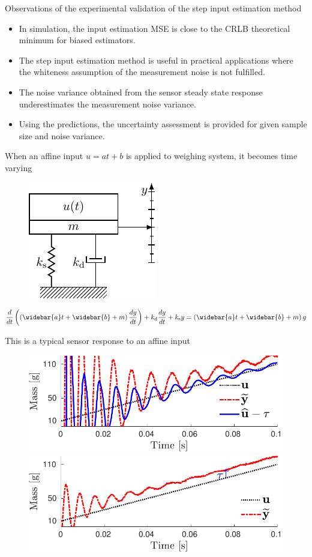 \documentclass[presentation]{beamer}
\begin{document}
\begin{frame}[label={slide:experimental-validation8}]{Observations of the experimental validation of the step input estimation method}
\begin{itemize}
\item In simulation, the input estimation MSE is close to the CRLB theoretical minimum for biased estimators.
\item The step input estimation method is useful in practical applications where the whiteness assumption of the measurement noise is not fulfilled. 
\item The noise variance obtained from the sensor steady state response underestimates the measurement noise variance.
\item Using the predictions, the uncertainty assessment is provided for given sample size and noise variance.
\end{itemize}

\end{frame}


\begin{frame}[label={slide:affine-input-estimation1}]{When an affine input $u=at+b$ is applied to weighing system, it becomes time varying}
\begin{figure}[htb!]
\centering
\includegraphics[width=0.3\columnwidth]{./fig/Aff_Fig_1.pdf} 
\end{figure}
\begin{equation*} \dfrac{d}{dt} \left( \left( \widebar{a} t + \widebar{b} + m \right) \dfrac{dy}{dt} \right) + k_{\mathrm{d}} \dfrac{dy}{dt} + k_{\mathrm{s}} y = \left( \widebar{a} t + \widebar{b} + m \right) g \end{equation*}
\end{frame}

\begin{frame}[label={slide:affine-input-estimation2}]{This is a typical sensor response to an affine input}
\begin{figure}[htb!]
\centering
\includegraphics[width=0.55\columnwidth]{./fig/Aff_Fig_2.pdf} 
\includegraphics[width=0.55\columnwidth]{./fig/Aff_Fig_3.pdf} 
\end{figure}
\end{frame}
\end{document}
